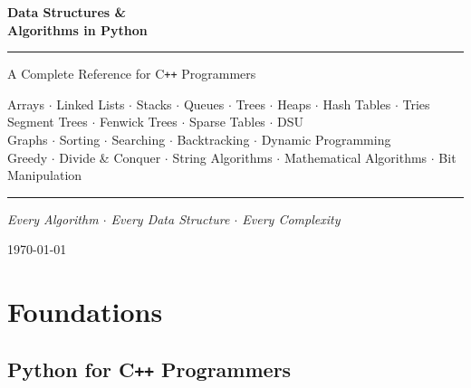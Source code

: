 \documentclass[11pt,a4paper]{report}
\begin{document}

\begin{titlepage}
\centering\vspace*{1.8cm}
{\Huge\bfseries\color{accentblue}Data Structures \&\\[6pt]Algorithms in Python\par}
\vspace{0.5cm}
{\color{gray}\rule{0.65\linewidth}{1pt}\par}
\vspace{0.4cm}
{\Large A Complete Reference for C\texttt{++} Programmers\par}
\vspace{0.3cm}
{\small\color{gray}
Arrays $\cdot$ Linked Lists $\cdot$ Stacks $\cdot$ Queues $\cdot$ Trees $\cdot$ Heaps $\cdot$
Hash Tables $\cdot$ Tries\\
Segment Trees $\cdot$ Fenwick Trees $\cdot$ Sparse Tables $\cdot$ DSU\\
Graphs $\cdot$ Sorting $\cdot$ Searching $\cdot$ Backtracking $\cdot$ Dynamic Programming\\
Greedy $\cdot$ Divide \& Conquer $\cdot$ String Algorithms $\cdot$
Mathematical Algorithms $\cdot$ Bit Manipulation\par}
\vspace{0.5cm}
{\color{gray}\rule{0.65\linewidth}{1pt}\par}
\vspace{1.5cm}
{\large\textit{Every Algorithm $\cdot$ Every Data Structure $\cdot$ Every Complexity}\par}
\vfill{\today}
\end{titlepage}

\tableofcontents\clearpage

\part{Foundations}

\chapter{Python for C\texttt{++} Programmers}
\end{document}
